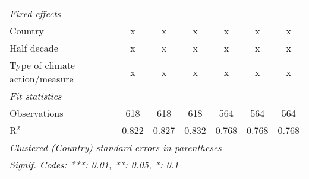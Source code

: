 \begin{tabular}{lcccccc}
   \emph{Fixed effects}\\
   Country                                                           & x       & x             & x             & x             & x             & x\\  
   Half decade                                                       & x       & x             & x             & x             & x             & x\\  
   Type of climate action/measure                                    & x       & x             & x             & x             & x             & x\\  
   \midrule \emph{Fit statistics}\\
   Observations                                                      & 618     & 618           & 618           & 564           & 564           & 564\\  
   R$^2$                                                             & 0.822   & 0.827         & 0.832         & 0.768         & 0.768         & 0.768\\  
   \midrule
   \multicolumn{7}{l}{\emph{Clustered (Country) standard-errors in parentheses}}\\
   \multicolumn{7}{l}{\emph{Signif. Codes: ***: 0.01, **: 0.05, *: 0.1}}\\
\end{tabular}
\par\endgroup


